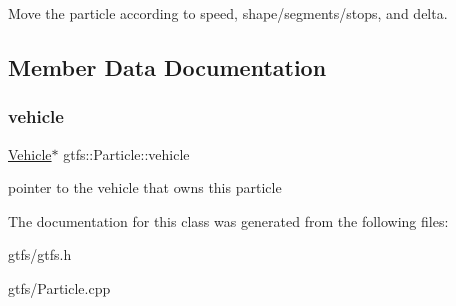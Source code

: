 Move the particle according to speed, shape/segments/stops, and {\ttfamily delta}. 

\subsection{Member Data Documentation}
\mbox{\label{classgtfs_1_1Particle_a81c313d505ecb592d79463f167dfb76c}} 
\subsubsection{\texorpdfstring{vehicle}{vehicle}}
{\footnotesize\ttfamily \hyperlink{classgtfs_1_1Vehicle}{Vehicle}$\ast$ gtfs\+::\+Particle\+::vehicle}

pointer to the vehicle that owns this particle 

The documentation for this class was generated from the following files\+:\begin{DoxyCompactItemize}
\item 
gtfs/gtfs.\+h\item 
gtfs/Particle.\+cpp\end{DoxyCompactItemize}
